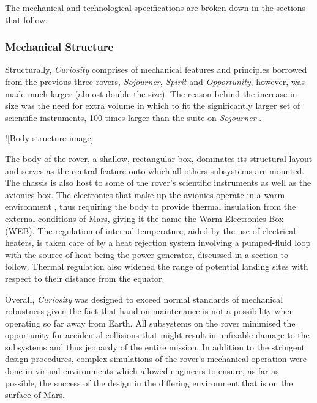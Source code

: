       The mechanical and technological specifications are broken down in the sections that follow.
      
      \subsubsection{Mechanical Structure}
        Structurally, \textit{Curiosity} comprises of mechanical features and principles borrowed from the previous three rovers, \textit{Sojourner}, \textit{Spirit} and \textit{Opportunity}, however, was made much larger (almost double the size). The reason behind the increase in size was the need for extra volume in which to fit the significantly larger set of scientific instruments, 100 times larger than the suite on \textit{Sojourner} \cite{planetary2011}.
        
        ![Body structure image]
        
        The body of the rover, a shallow, rectangular box, dominates its structural layout and serves as the central feature onto which all others subsystems are mounted. The chassis is also host to some of the rover's scientific instruments as well as the avionics box. The electronics that make up the avionics operate in a warm environment \cite{nasajulypresskit}, thus requiring the body to provide thermal insulation from the external conditions of Mars, giving it the name the Warm Electronics Box (WEB). The regulation of internal temperature, aided by the use of electrical heaters, is taken care of by a heat rejection system involving a pumped-fluid loop with the source of heat being the power generator, discussed in a section to follow. Thermal regulation also widened the range of potential landing sites with respect to their distance from the equator.
        
        Overall, \textit{Curiosity} was designed to exceed normal standards of mechanical robustness given the fact that hand-on maintenance is not a possibility when operating so far away from Earth. All subsystems on the rover minimised the opportunity for accidental collisions that might result in unfixable damage to the subsystems and thus jeopardy of the entire mission. In addition to the stringent design procedures, complex simulations of the rover's mechanical operation were done in virtual environments which allowed engineers to ensure, as far as possible, the success of the design in the differing environment that is on the surface of Mars.
        
